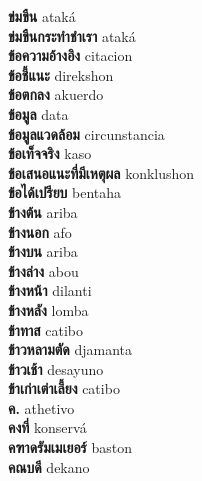 \textbf{ ข่มขืน  } ataká \\
\textbf{ ข่มขืนกระทำชำเรา  } ataká \\
\textbf{ ข้อความอ้างอิง  } citacion \\
\textbf{ ข้อชี้แนะ  } direkshon \\
\textbf{ ข้อตกลง  } akuerdo \\
\textbf{ ข้อมูล  } data \\
\textbf{ ข้อมูลแวดล้อม  } circunstancia \\
\textbf{ ข้อเท็จจริง  } kaso \\
\textbf{ ข้อเสนอแนะที่มีเหตุผล  } konklushon \\
\textbf{ ข้อได้เปรียบ  } bentaha \\
\textbf{ ข้างต้น  } ariba \\
\textbf{ ข้างนอก  } afo \\
\textbf{ ข้างบน  } ariba \\
\textbf{ ข้างล่าง  } abou \\
\textbf{ ข้างหน้า  } dilanti \\
\textbf{ ข้างหลัง  } lomba \\
\textbf{ ข้าทาส  } catibo \\
\textbf{ ข้าวหลามตัด  } djamanta \\
\textbf{ ข้าวเช้า  } desayuno \\
\textbf{ ข้าเก่าเต่าเลี้ยง  } catibo \\
\textbf{ ค.  } athetivo \\
\textbf{ คงที่  } konservá \\
\textbf{ คฑาดรัมเมเยอร์  } baston \\
\textbf{ คณบดี  } dekano \\
